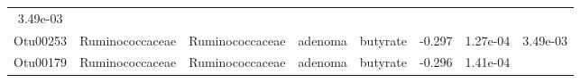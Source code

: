 \documentclass[11pt,]{article}
\begin{document}
\begin{longtable}[]{@{}cccccccc@{}}
\begin{minipage}[t]{0.08\columnwidth}
3.49e-03\strut
\end{minipage}\tabularnewline
\begin{minipage}[t]{0.08\columnwidth}\centering\strut
Otu00253\strut
\end{minipage} & \begin{minipage}[t]{0.15\columnwidth}\centering\strut
Ruminococcaceae\strut
\end{minipage} & \begin{minipage}[t]{0.15\columnwidth}\centering\strut
Ruminococcaceae\strut
\end{minipage} & \begin{minipage}[t]{0.08\columnwidth}\centering\strut
adenoma\strut
\end{minipage} & \begin{minipage}[t]{0.09\columnwidth}\centering\strut
butyrate\strut
\end{minipage} & \begin{minipage}[t]{0.07\columnwidth}\centering\strut
-0.297\strut
\end{minipage} & \begin{minipage}[t]{0.08\columnwidth}\centering\strut
1.27e-04\strut
\end{minipage} & \begin{minipage}[t]{0.08\columnwidth}\centering\strut
3.49e-03\strut
\end{minipage}\tabularnewline
\begin{minipage}[t]{0.08\columnwidth}\centering\strut
Otu00179\strut
\end{minipage} & \begin{minipage}[t]{0.15\columnwidth}\centering\strut
Ruminococcaceae\strut
\end{minipage} & \begin{minipage}[t]{0.15\columnwidth}\centering\strut
Ruminococcaceae\strut
\end{minipage} & \begin{minipage}[t]{0.08\columnwidth}\centering\strut
adenoma\strut
\end{minipage} & \begin{minipage}[t]{0.09\columnwidth}\centering\strut
butyrate\strut
\end{minipage} & \begin{minipage}[t]{0.07\columnwidth}\centering\strut
-0.296\strut
\end{minipage} & \begin{minipage}[t]{0.08\columnwidth}\centering\strut
1.41e-04\strut
\end{minipage} & \begin{minipage}[t]{0.08\columnwidth}\centering\strut

\end{minipage}
\end{longtable}
\end{document}
